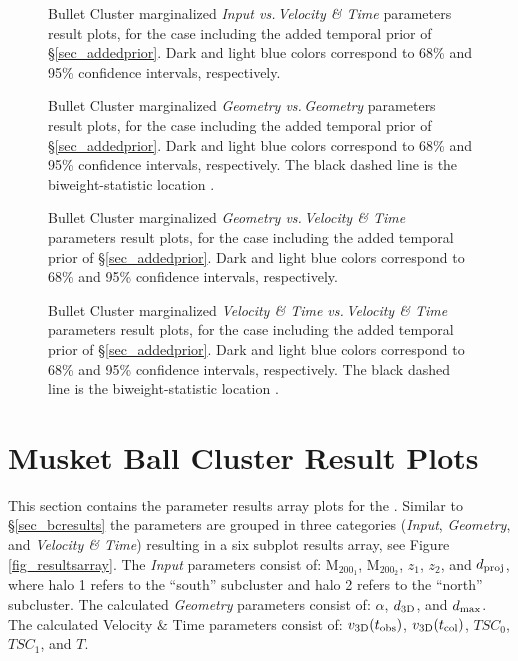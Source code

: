 \begin{figure}
\caption{Bullet Cluster marginalized \emph{Input vs.\,Velocity \& Time} parameters result plots, for the case including the added temporal prior of \S\ref{sec_addedprior}.  Dark and light blue colors correspond to 68\% and 95\% confidence intervals, respectively.
\label{fig_bc_invt}}
\end{figure}

\begin{figure}
\caption{Bullet Cluster marginalized \emph{Geometry vs.\,Geometry} parameters result plots, for the case including the added temporal prior of \S\ref{sec_addedprior}.  Dark and light blue colors correspond to 68\% and 95\% confidence intervals, respectively.  The black dashed line is the biweight-statistic location \citep{Beers:1982dp}.
\label{fig_bc_geogeo}}
\end{figure}

\begin{figure}
\caption{Bullet Cluster marginalized \emph{Geometry vs.\,Velocity \& Time} parameters result plots, for the case including the added temporal prior of \S\ref{sec_addedprior}.  Dark and light blue colors correspond to 68\% and 95\% confidence intervals, respectively.
\label{fig_bc_geovt}}
\end{figure}

\begin{figure}
\caption{Bullet Cluster marginalized \emph{Velocity \& Time vs.\,Velocity \& Time} parameters result plots, for the case including the added temporal prior of \S\ref{sec_addedprior}.  Dark and light blue colors correspond to 68\% and 95\% confidence intervals, respectively.  The black dashed line is the biweight-statistic location \citep{Beers:1982dp}.
\label{fig_bc_vtvt}}
\end{figure}
\clearpage


\section{Musket Ball Cluster Result Plots}\label{sec_mbcresults}

This section contains the parameter results array plots for the .
Similar to \S\ref{sec_bcresults} the parameters are grouped in three categories (\emph{Input}, \emph{Geometry}, and \emph{Velocity \& Time}) resulting in a six subplot results array, see Figure \ref{fig_resultsarray}.
The \emph{Input} parameters consist of: M$_{200_1}$, M$_{200_2}$, $z_1$, $z_2$,	and $d_{\rm proj}$, where halo 1 refers to the ``south'' subcluster and halo 2 refers to the ``north'' subcluster.
The calculated \emph{Geometry} parameters consist of: $\alpha$, $d_{\rm 3D}$, and $d_{\rm max}$.
The calculated Velocity \& Time parameters consist of:  $v_{\rm 3D}(t_{\rm obs})$, $v_{\rm 3D}(t_{\rm col})$, $TSC_0$, $TSC_1$, and $T$.

